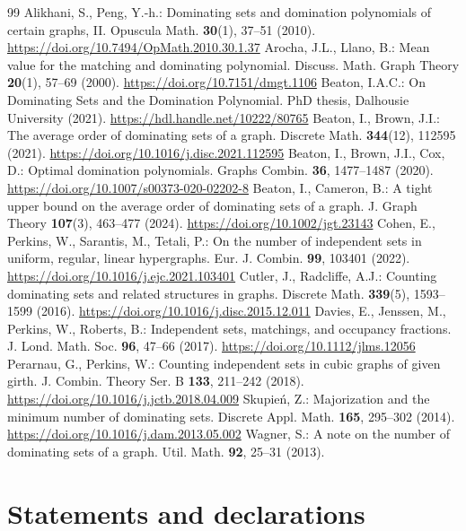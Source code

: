 \documentclass[11pt]{article}
\begin{document}
\begin{thebibliography}{99}
 Alikhani, S., Peng, Y.-h.: Dominating sets and domination polynomials of certain graphs, II. Opuscula Math. \textbf{30}(1), 37--51 (2010). \url{https://doi.org/10.7494/OpMath.2010.30.1.37}
 Arocha, J.L., Llano, B.: Mean value for the matching and dominating polynomial. Discuss. Math. Graph Theory \textbf{20}(1), 57--69 (2000). \url{https://doi.org/10.7151/dmgt.1106}
 Beaton, I.A.C.: On Dominating Sets and the Domination Polynomial. PhD thesis, Dalhousie University (2021). \url{https://hdl.handle.net/10222/80765}
 Beaton, I., Brown, J.I.: The average order of dominating sets of a graph. Discrete Math. \textbf{344}(12), 112595 (2021). \url{https://doi.org/10.1016/j.disc.2021.112595}
 Beaton, I., Brown, J.I., Cox, D.: Optimal domination polynomials. Graphs Combin. \textbf{36}, 1477--1487 (2020). \url{https://doi.org/10.1007/s00373-020-02202-8}
 Beaton, I., Cameron, B.: A tight upper bound on the average order of dominating sets of a graph. J. Graph Theory \textbf{107}(3), 463--477 (2024). \url{https://doi.org/10.1002/jgt.23143}
 Cohen, E., Perkins, W., Sarantis, M., Tetali, P.: On the number of independent sets in uniform, regular, linear hypergraphs. Eur. J. Combin. \textbf{99}, 103401 (2022). \url{https://doi.org/10.1016/j.ejc.2021.103401}
 Cutler, J., Radcliffe, A.J.: Counting dominating sets and related structures in graphs. Discrete Math. \textbf{339}(5), 1593--1599 (2016). \url{https://doi.org/10.1016/j.disc.2015.12.011}
 Davies, E., Jenssen, M., Perkins, W., Roberts, B.: Independent sets, matchings, and occupancy fractions. J. Lond. Math. Soc. \textbf{96}, 47--66 (2017). \url{https://doi.org/10.1112/jlms.12056}
 Perarnau, G., Perkins, W.: Counting independent sets in cubic graphs of given girth. J. Combin. Theory Ser. B \textbf{133}, 211--242 (2018). \url{https://doi.org/10.1016/j.jctb.2018.04.009}
 Skupie\'n, Z.: Majorization and the minimum number of dominating sets. Discrete Appl. Math. \textbf{165}, 295--302 (2014). \url{https://doi.org/10.1016/j.dam.2013.05.002}
 Wagner, S.: A note on the number of dominating sets of a graph. Util. Math. \textbf{92}, 25--31 (2013).
\end{thebibliography}

\section*{Statements and declarations}
\end{document}
